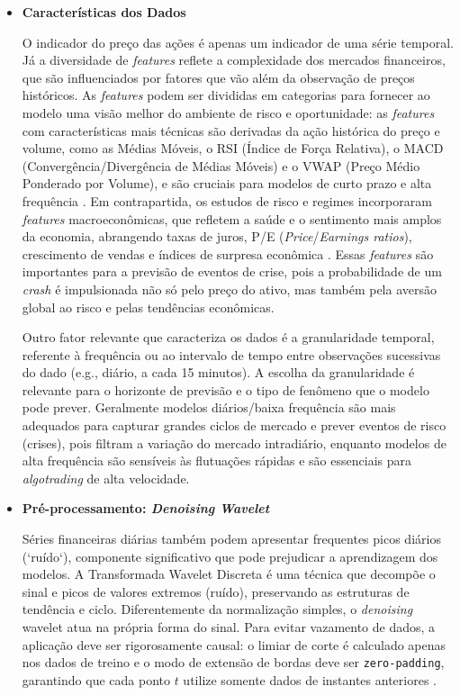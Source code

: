 \begin{itemize}
    \item \textbf{Características dos Dados}

    O indicador do preço das ações é apenas um indicador de uma série temporal. Já a diversidade de \textit{features} reflete a complexidade dos mercados financeiros, que são influenciados por fatores que vão além da observação de preços históricos. As \textit{features} podem ser divididas em categorias para fornecer ao modelo uma visão melhor do ambiente de risco e oportunidade: as \textit{features} com características mais técnicas são derivadas da ação histórica do preço e volume, como as Médias Móveis, o RSI (Índice de Força Relativa), o MACD (Convergência/Divergência de Médias Móveis) e o VWAP (Preço Médio Ponderado por Volume), e são cruciais para modelos de curto prazo e alta frequência \cite{Ayatollahi2025XAIStockCrashes}. Em contrapartida, os estudos de risco e regimes incorporaram \textit{features} macroeconômicas, que refletem a saúde e o sentimento mais amplos da economia, abrangendo taxas de juros, P/E (\textit{Price}/\textit{Earnings ratios}), crescimento de vendas e índices de surpresa econômica \cite{Benhamou2021XAIPlanning}. Essas \textit{features} são importantes para a previsão de eventos de crise, pois a probabilidade de um \textit{crash} é impulsionada não só pelo preço do ativo, mas também pela aversão global ao risco e pelas tendências econômicas.

    Outro fator relevante que caracteriza os dados é a granularidade temporal, referente à frequência ou ao intervalo de tempo entre observações sucessivas do dado (e.g., diário, a cada 15 minutos). A escolha da granularidade é relevante para o horizonte de previsão e o tipo de fenômeno que o modelo pode prever. Geralmente modelos diários/baixa frequência são mais adequados para capturar grandes ciclos de mercado e prever eventos de risco (crises), pois filtram a variação do mercado intradiário, enquanto modelos de alta frequência são sensíveis às flutuações rápidas e são essenciais para \textit{algotrading} de alta velocidade.

    \item \textbf{Pré-processamento: \textit{Denoising Wavelet}}

    Séries financeiras diárias também podem apresentar frequentes picos diários (`ruído`), componente significativo que pode prejudicar a aprendizagem dos modelos. A Transformada Wavelet Discreta é uma técnica que decompõe o sinal e picos de valores extremos (ruído), preservando as estruturas de tendência e ciclo. Diferentemente da normalização simples, o \textit{denoising} wavelet atua na própria forma do sinal. Para evitar vazamento de dados, a aplicação deve ser rigorosamente causal: o limiar de corte é calculado apenas nos dados de treino e o modo de extensão de bordas deve ser \texttt{zero-padding}, garantindo que cada ponto $t$ utilize somente dados de instantes anteriores \cite{Qiao2022}.

\end{itemize}

